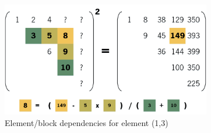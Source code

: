 \documentclass[../thesis]{subfiles}
\begin{document}
	\begin{figure}[htp]
		\centering
		\includegraphics[height=5cm]{assets/images/case/dependencies.png}
		\caption[Element/block dependencies.]{Element/block dependencies for element (1,3)}
	\end{figure}
\end{document}
